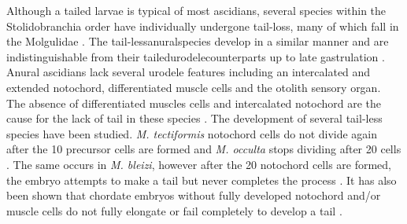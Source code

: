 Although a tailed larvae is typical of most ascidians, several species within the Stolidobranchia order have individually undergone tail-loss, many of which fall in the Molgulidae \cite{berrill_studies_1931, jeffery_evolution_1999, huber_evolution_2000, maliska_molgula_2010}. The tail-less\textemdash anural\textemdash species develop in a similar manner and are indistinguishable from their tailed\textemdash urodele\textemdash counterparts up to late gastrulation \cite{berrill_studies_1931, swalla_interspecific_1990, jeffery_factors_1992}. Anural ascidians lack several urodele features including an intercalated and extended notochord, differentiated muscle cells and the otolith sensory organ. The absence of differentiated muscles cells and intercalated notochord are the cause for the lack of tail in these species \cite{miyamoto_formation_1985, swalla_interspecific_1990}. The development of several tail-less species have been studied. \textit{M. tectiformis} notochord cells do not divide again after the 10 precursor cells are formed and \textit{M. occulta} stops dividing after 20 cells \cite{jeffery_evolution_1999}. The same occurs in \textit{M. bleizi}, however after the 20 notochord cells are formed, the embryo attempts to make a tail but never completes the process \cite{swalla_novel_1993}. It has also been shown that chordate embryos without fully developed notochord and/or muscle cells do not fully elongate or fail completely to develop a tail \cite{jeffery_evolution_1999,takada_brachyury_2002,stemple_structure_2005}. 
